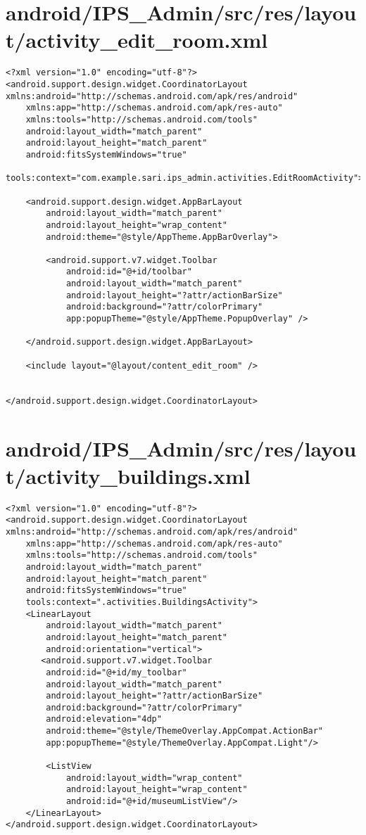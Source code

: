 \section{android/IPS\_Admin/src/res/layout/activity\_edit\_room.xml}
\begin{lstlisting}<?xml version="1.0" encoding="utf-8"?>
<android.support.design.widget.CoordinatorLayout xmlns:android="http://schemas.android.com/apk/res/android"
    xmlns:app="http://schemas.android.com/apk/res-auto"
    xmlns:tools="http://schemas.android.com/tools"
    android:layout_width="match_parent"
    android:layout_height="match_parent"
    android:fitsSystemWindows="true"
    tools:context="com.example.sari.ips_admin.activities.EditRoomActivity">

    <android.support.design.widget.AppBarLayout
        android:layout_width="match_parent"
        android:layout_height="wrap_content"
        android:theme="@style/AppTheme.AppBarOverlay">

        <android.support.v7.widget.Toolbar
            android:id="@+id/toolbar"
            android:layout_width="match_parent"
            android:layout_height="?attr/actionBarSize"
            android:background="?attr/colorPrimary"
            app:popupTheme="@style/AppTheme.PopupOverlay" />

    </android.support.design.widget.AppBarLayout>

    <include layout="@layout/content_edit_room" />


</android.support.design.widget.CoordinatorLayout>
\end{lstlisting}
\newpage
\section{android/IPS\_Admin/src/res/layout/activity\_buildings.xml}
\begin{lstlisting}<?xml version="1.0" encoding="utf-8"?>
<android.support.design.widget.CoordinatorLayout xmlns:android="http://schemas.android.com/apk/res/android"
    xmlns:app="http://schemas.android.com/apk/res-auto"
    xmlns:tools="http://schemas.android.com/tools"
    android:layout_width="match_parent"
    android:layout_height="match_parent"
    android:fitsSystemWindows="true"
    tools:context=".activities.BuildingsActivity">
    <LinearLayout
        android:layout_width="match_parent"
        android:layout_height="match_parent"
        android:orientation="vertical">
       <android.support.v7.widget.Toolbar
        android:id="@+id/my_toolbar"
        android:layout_width="match_parent"
        android:layout_height="?attr/actionBarSize"
        android:background="?attr/colorPrimary"
        android:elevation="4dp"
        android:theme="@style/ThemeOverlay.AppCompat.ActionBar"
        app:popupTheme="@style/ThemeOverlay.AppCompat.Light"/>

        <ListView
            android:layout_width="wrap_content"
            android:layout_height="wrap_content"
            android:id="@+id/museumListView"/>
    </LinearLayout>
</android.support.design.widget.CoordinatorLayout>
\end{lstlisting}
\newpage
